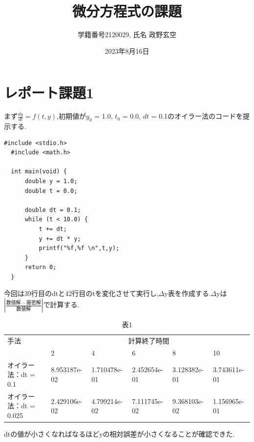 \documentclass[a4j,10pt,dvipdfmx]{jarticle}
\begin{document}
\title{微分方程式の課題}
\author{学籍番号2120029, 氏名 政野玄空}
\date{2023年8月16日}
\maketitle
\section{レポート課題1}

まず$\frac{dy}{dt} = f(t,y)$,初期値が$y_0$ = 1.0, $t_0$ = 0.0, $dt$ = 0.1のオイラー法のコードを提示する.
\begin{lstlisting}[label=prm1, caption=kadai5-1]
  #include <stdio.h>
  #include <math.h>
  
  int main(void) {
      double y = 1.0;
      double t = 0.0;
  
      double dt = 0.1;
      while (t < 10.0) {
          t += dt;
          y += dt * y;
          printf("%f,%f \n",t,y);
      }
      return 0;
  }  
\end{lstlisting}
今回は39行目のdtと42行目のtを変化させて実行し,$\Delta$y表を作成する.$\Delta$yは$\left| \frac{数値解-厳密解}{数値解} \right|$で計算する.
\begin{table}[H]
  \label{1}
  \begin{center}
  \caption{表1}
  \begin{tabular}{|l|l|l|l|l|l|}
  \hline
      手法 & \multicolumn{5}{|c|}{計算終了時間} \\\cline{2-6}
      & 2 & 4 & 6 & 8 & 10 \\ \hline
      オイラー法：dt = 0.1 & 8.953187e-02 & 1.710478e-01 & 2.452654e-01 & 3.128382e-01 & 3.743611e-01 \\ \hline
      オイラー法：dt = 0.025 & 2.429106e-02 & 4.799214e-02 & 7.111745e-02 & 9.368103e-02 & 1.156965e-01 \\ \hline
  \end{tabular}
\end{center}
\end{table}
dtの値が小さくなればなるほどyの相対誤差が小さくなることが確認できた.
\end{document}
